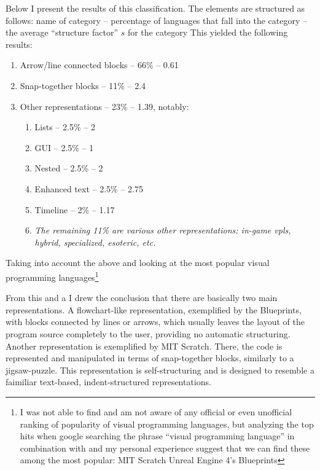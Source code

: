 Below I present the results of this classification. The elements are structured
as follows: name of category -- percentage of languages that fall into the
category -- the average ``structure factor'' $s$ for the category This yielded
the following results:
\begin{enumerate}
    \item Arrow/line connected blocks -- 66\% -- 0.61
    \item Snap-together blocks -- 11\% -- 2.4
    \item Other representations -- 23\% -- 1.39, notably:
    \begin{enumerate}
        \item Lists -- 2.5\% -- 2
        \item GUI -- 2.5\% -- 1
        \item Nested -- 2.5\% -- 2
        \item Enhanced text -- 2.5\% -- 2.75
        \item Timeline -- 2\% -- 1.17
        \item \textit{The remaining 11\% are various other representations:
          in-game \acrshort{vpl}s, hybrid, specialized, esoteric, etc.}
    \end{enumerate}
\end{enumerate}

Taking into account the above and looking at the most popular visual programming
languages\footnote{I was not able to find and am not aware of any official or
  even unofficial ranking of popularity of visual programming languages, but
  analyzing the top hits when google searching the phrase ``visual programming
  language'' in combination with\cite{vpl_wikipedia} and my
  personal experience suggest that we can find these among the most popular: MIT
  Scratch Unreal Engine 4's Blueprints}

From this and a I drew the conclusion that there are basically two main
representations. A flowchart-like representation, exemplified by the Blueprints,
with blocks connected by lines or arrows, which usually leaves the layout of the
program source completely to the user, providing no automatic
structuring. Another representation is exemplified by MIT Scratch. There, the
code is represented and manipulated in terms of snap-together blocks, similarly
to a jigsaw-puzzle. This representation is self-structuring and is designed to
resemble a faimiliar text-based, indent-structured representations.

